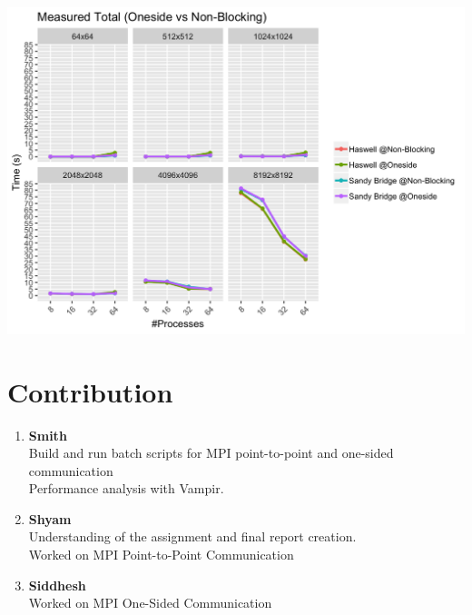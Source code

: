 \documentclass[10pt, letterpaper, twoside]{article}
\begin{document}
\begin{titlepage}
\begin{enumerate}
\includegraphics[scale = 0.18]{OSP2P_Measured-Total_InputSize.png}
\end{enumerate}

\section{Contribution}

\begin{enumerate}
\item \textbf{Smith} \\ 
 Build and run batch scripts for MPI point-to-point and one-sided communication \\
 Performance analysis with Vampir. \\ 

\item \textbf{Shyam} \\ 
 Understanding of the assignment and final report creation.  \\
 Worked on MPI Point-to-Point Communication\\

\item \textbf{Siddhesh} \\ 
 Worked on MPI One-Sided Communication  \\
\end{enumerate}
\end{titlepage}
\end{document}

